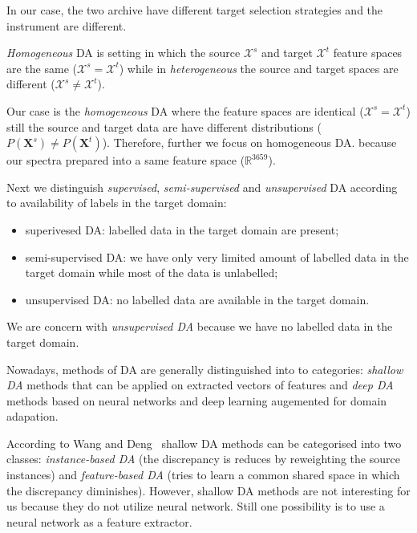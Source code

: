 In our case, the two archive have different target selection strategies
and the instrument are different.

\begin{definition}
	\textit{Homogeneous} DA is setting in which the source \(\mathcal{X}^s\)
	and target \(\mathcal{X}^t\) feature spaces are the same
	(\(\mathcal{X}^s = \mathcal{X}^t\))
	while in \textit{heterogeneous} the source and target spaces are different
	(\(\mathcal{X}^s \ne \mathcal{X}^t\)).~\cite{csurka2017}
\end{definition}

Our case is the \textit{homogeneous} DA where the feature spaces are identical
(\(\mathcal{X}^s = \mathcal{X}^t\))
still the source and target data are have different distributions
(\(P(\mathbf{X}^s) \ne P(\mathbf{X}^t)\)).
Therefore, further we focus on homogeneous DA.
because our spectra prepared into a same feature space (\(\mathbb{R}^{3659}\)).

Next we distinguish \textit{supervised}, \textit{semi-supervised}
and \textit{unsupervised} DA
according to availability of labels in the target domain:

\begin{itemize}
	\item superivesed DA: labelled data in the target domain are present;
	\item semi-supervised DA: we have only very limited amount of labelled data in the target domain while most of the data is unlabelled;
	\item unsupervised DA: no labelled data are available in the target domain.
\end{itemize}

We are concern with \textit{unsupervised DA} because we have
no labelled data in the target domain.~\cite{wang2018}

Nowadays, methods of DA are generally distinguished into to categories:
\textit{shallow DA} methods that can be applied on extracted vectors of features
and \textit{deep DA} methods based on neural networks and deep learning
augemented for domain adapation.~\cite{csurka2017}

According to Wang and Deng~\cite{wang2018} shallow DA methods
can be categorised into two classes:
\textit{instance-based DA}
(the discrepancy is reduces by reweighting the source instances)
and \textit{feature-based DA}
(tries to learn a common shared space in which the discrepancy diminishes).
However, shallow DA methods are not interesting for us
because they do not utilize neural network.
Still one possibility is to use a neural network as a feature extractor.

